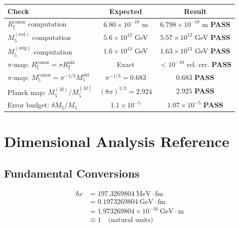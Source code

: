 \documentclass[11pt,a4paper]{article}
\newcommand{\Rxi}{R_\xi}
\newcommand{\Mfive}{M_5}
\newcommand{\hbarc}{\hbar c}
\newcommand{\PASS}{\textcolor{green!70!black}{\textbf{PASS}}}
\begin{document}
\begin{tcolorbox}[title=Audit Results, colback=green!10, colframe=green!50!black]
\begin{center}
\begin{tabular}{lcc}
\toprule
\textbf{Check} & \textbf{Expected} & \textbf{Result} \\
\midrule
$\Rxi^{\mathrm{canon}}$ computation & $6.80 \times 10^{-18}$ m & $6.798 \times 10^{-18}$ m \PASS \\
$\Mfive^{\mathrm{(red)}}$ computation & $5.6 \times 10^{12}$ GeV & $5.57 \times 10^{12}$ GeV \PASS \\
$\Mfive^{\mathrm{(orig)}}$ computation & $1.6 \times 10^{13}$ GeV & $1.63 \times 10^{13}$ GeV \PASS \\
\midrule
$\pi$-map: $\Rxi^{\mathrm{canon}} = \pi \Rxi^{\mathrm{old}}$ & Exact & $< 10^{-10}$ rel. err. \PASS \\
$\pi$-map: $\Mfive^{\mathrm{canon}} = \pi^{-1/3} \Mfive^{\mathrm{old}}$ & $\pi^{-1/3} = 0.683$ & $0.683$ \PASS \\
\midrule
Planck map: $\Mfive^{(M)}/\Mfive^{(\bar{M})}$ & $(8\pi)^{1/3} = 2.924$ & $2.925$ \PASS \\
\midrule
Error budget: $\delta\Mfive/\Mfive$ & $1.1 \times 10^{-5}$ & $1.07 \times 10^{-5}$ \PASS \\
\bottomrule
\end{tabular}
\end{center}
\end{tcolorbox}

\appendix
\section{Dimensional Analysis Reference}

\subsection{Fundamental Conversions}

\begin{align}
\hbarc &= 197.3269804~\mathrm{MeV \cdot fm} \label{eq:hbarc-MeV}\\
&= 0.1973269804~\mathrm{GeV \cdot fm} \label{eq:hbarc-GeV-fm}\\
&= 1.973269804 \times 10^{-16}~\mathrm{GeV \cdot m} \label{eq:hbarc-GeV-m}\\
&\equiv 1 \quad \text{(natural units)} \label{eq:hbarc-natural}
\end{align}
\end{document}
